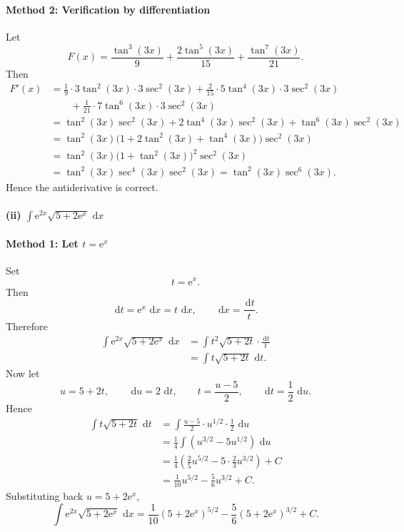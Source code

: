 \documentclass[12pt]{article}
\newcommand{\dd}{\,\mathrm{d}}
\newcommand{\ee}{\mathrm{e}}
\begin{document}
\paragraph{Method 2: Verification by differentiation}
Let
\[
F(x)=\frac{\tan^3(3x)}{9}+\frac{2\tan^5(3x)}{15}+\frac{\tan^7(3x)}{21}.
\]
Then
\begin{align*}
F'(x)
&=\frac{1}{9}\cdot 3\tan^2(3x)\cdot 3\sec^2(3x)
+\frac{2}{15}\cdot 5\tan^4(3x)\cdot 3\sec^2(3x) \\
&\qquad +\frac{1}{21}\cdot 7\tan^6(3x)\cdot 3\sec^2(3x) \\
&=\tan^2(3x)\sec^2(3x)+2\tan^4(3x)\sec^2(3x)+\tan^6(3x)\sec^2(3x) \\
&=\tan^2(3x)\bigl(1+2\tan^2(3x)+\tan^4(3x)\bigr)\sec^2(3x) \\
&=\tan^2(3x)\bigl(1+\tan^2(3x)\bigr)^2\sec^2(3x) \\
&=\tan^2(3x)\sec^4(3x)\sec^2(3x)
=\tan^2(3x)\sec^6(3x).
\end{align*}
Hence the antiderivative is correct.

\paragraph{(ii) \(\displaystyle \int \ee^{2x}\sqrt{5+2\ee^x}\,\dd x\)}

\paragraph{Method 1: Let \(t=\ee^x\)}
Set
\[
t=\ee^x.
\]
Then
\[
\dd t=\ee^x\,\dd x=t\,\dd x,
\qquad
\dd x=\frac{\dd t}{t}.
\]
Therefore
\begin{align*}
\int \ee^{2x}\sqrt{5+2\ee^x}\,\dd x
&=\int t^2\sqrt{5+2t}\cdot \frac{\dd t}{t} \\
&=\int t\sqrt{5+2t}\,\dd t.
\end{align*}
Now let
\[
u=5+2t,
\qquad
\dd u=2\,\dd t,
\qquad
t=\frac{u-5}{2},
\qquad
\dd t=\frac{1}{2}\,\dd u.
\]
Hence
\begin{align*}
\int t\sqrt{5+2t}\,\dd t
&=\int \frac{u-5}{2}\cdot u^{1/2}\cdot \frac{1}{2}\,\dd u \\
&=\frac{1}{4}\int (u^{3/2}-5u^{1/2})\,\dd u \\
&=\frac{1}{4}\left(\frac{2}{5}u^{5/2}-5\cdot \frac{2}{3}u^{3/2}\right)+C \\
&=\frac{1}{10}u^{5/2}-\frac{5}{6}u^{3/2}+C.
\end{align*}
Substituting back \(u=5+2\ee^x\),
\[
\boxed{\int \ee^{2x}\sqrt{5+2\ee^x}\,\dd x
=\frac{1}{10}(5+2\ee^x)^{5/2}-\frac{5}{6}(5+2\ee^x)^{3/2}+C.}
\]
\end{document}
